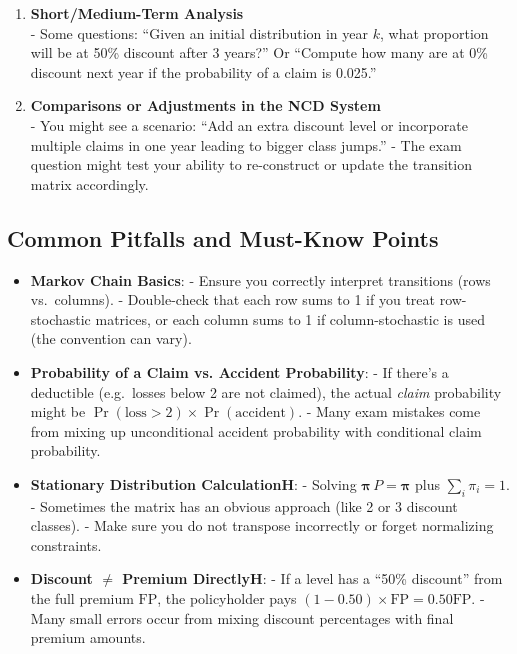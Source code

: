 \documentclass[13pt,a4paper]{article}
\begin{document}
\begin{enumerate}
  \item \textbf{Short/Medium-Term Analysis} \\
    - Some questions: “Given an initial distribution in year \(k\), what proportion will be at 50\% discount after 3 years?” Or “Compute how many are at 0\% discount next year if the probability of a claim is 0.025.”

  \item \textbf{Comparisons or Adjustments in the NCD System} \\
    - You might see a scenario: “Add an extra discount level or incorporate multiple claims in one year leading to bigger class jumps.”  
    - The exam question might test your ability to re-construct or update the transition matrix accordingly.
\end{enumerate}

\subsection{Common Pitfalls and Must-Know Points}
\begin{itemize}
  \item \textbf{Markov Chain Basics}:
    - Ensure you correctly interpret transitions (rows vs.\ columns).  
    - Double-check that each row sums to 1 if you treat row-stochastic matrices, or each column sums to 1 if column-stochastic is used (the convention can vary).
  \item \textbf{Probability of a Claim vs. Accident Probability}:
    - If there’s a deductible (e.g.\ losses below 2 are not claimed), the actual \emph{claim} probability might be \(\Pr(\text{loss} > 2)\times\Pr(\text{accident})\).  
    - Many exam mistakes come from mixing up unconditional accident probability with conditional claim probability.
  \item \textbf{Stationary Distribution CalculationH}:
    - Solving \(\boldsymbol{\pi}\,P=\boldsymbol{\pi}\) plus \(\sum_i \pi_i=1\).  
    - Sometimes the matrix has an obvious approach (like 2 or 3 discount classes).  
    - Make sure you do not transpose incorrectly or forget normalizing constraints.
  \item \textbf{Discount \(\neq\) Premium DirectlyH}:
    - If a level has a “50\% discount” from the full premium \(\mathrm{FP}\), the policyholder pays \((1 - 0.50)\times \mathrm{FP} = 0.50\mathrm{FP}\).  
    - Many small errors occur from mixing discount percentages with final premium amounts.
\end{itemize}
\end{document}
